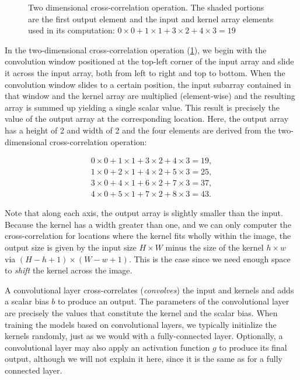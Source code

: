 \begin{figure}[hpt]
	\centering
	
	\caption{Two dimensional cross-correlation operation. The shaded portions are the first output element and the input and kernel array elements used in its computation: $0 \times 0+1 \times 1+3 \times 2+4 \times 3=19$}
	\label{fig:correlation}
\end{figure}

In the two-dimensional cross-correlation operation (\cref{fig:correlation}), we begin with the convolution window positioned at the top-left corner of the input array and slide it across the input array, both from left to right and top to bottom. When the convolution window slides to a certain position, the input subarray contained in that window and the kernel array are multiplied (element-wise) and the resulting array is summed up yielding a single scalar value. This result is precisely the value of the output array at the corresponding location. Here, the output array has a height of 2 and width of 2 and the four elements are derived from the two-dimensional cross-correlation operation:

\begin{align*}
0 \times 0+1 \times 1+3 \times 2+4 \times 3=19,\\
1 \times 0+2 \times 1+4 \times 2+5 \times 3=25,\\
3 \times 0+4 \times 1+6 \times 2+7 \times 3=37,\\
4 \times 0+5 \times 1+7 \times 2+8 \times 3=43.
\end{align*}

Note that along each axis, the output array is slightly smaller than the input. Because the kernel has a width greater than one, and we can only computer the cross-correlation for locations where the kernel fits wholly within the image, the output size is given by the input size $H \times W$  minus the size of the kernel $h \times w$ via $(H-h+1)\times(W-w+1)$. This is the case since we need enough space to \textit{shift} the kernel across the image.

A convolutional layer cross-correlates (\textit{convolves}) the input and kernels and adds a scalar bias $b$ to produce an output. The parameters of the convolutional layer are precisely the values that constitute the kernel and the scalar bias. When training the models based on convolutional layers, we typically initialize the kernels randomly, just as we would with a fully-connected layer. Optionally, a convolutional layer may also apply an activation function $g$ to produce its final output, although we will not explain it here, since it is the same as for a fully connected layer.

